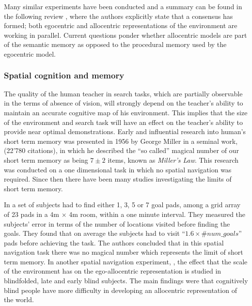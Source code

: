 Many similar experiments have been conducted and a summary can be found in the following review \cite{spatial_memory_how_ego_allo_combine_2006},
where the authors explicitly state that a consensus has formed; both egocentric and allocentric representations of the environment are 
working in parallel. Current questions ponder whether allocentric models are part of the semantic memory as opposed to the procedural 
memory used by the egocentric model.

\subsubsection{Spatial cognition and memory}

The quality of the human teacher in  search tasks, which are partially observable in the terms of absence of vision,
will strongly depend on the teacher's ability to maintain an accurate cognitive map of his environment. This implies
that the size of the environment and search task will have an effect on the teacher's ability to provide near optimal 
demonstrations. 
Early and influential research into human's short term memory was presented in 1956 by George Miller in a seminal work, \cite{cogprints730} 
(22'780 citations), in which he described the ``so called'' magical number of our short term memory as being $7\pm2$ items, 
known as \textit{Miller's Law}. This research was conducted on a  one dimensional task in which no spatial navigation was required.
Since then there have been many studies investigating the limits of short term memory.

In \cite{human_stsm_2015} a set of subjects had to find either 1, 3, 5 or 7 goal pads, among a grid array of 23 pads in a 4m $\times$ 4m room, 
within a one minute interval. They measured the subjects' error in terms of the number of locations visited before finding the goals. 
They found that on average the subjects had to visit ``$1.6 \times \#num\_goals$'' pads before achieving the task. The authors concluded 
that in this spatial navigation task there was no magical number which represents the limit of short term memory.
In another spatial navigation experiment, \cite{Iachini2014}, the effect that the scale of the environment 
has on the ego-allocentric representation is studied in blindfolded, late and early blind subjects. The main findings were
that cognitively blind people have more difficulty in developing an allocentric representation of the world. 

